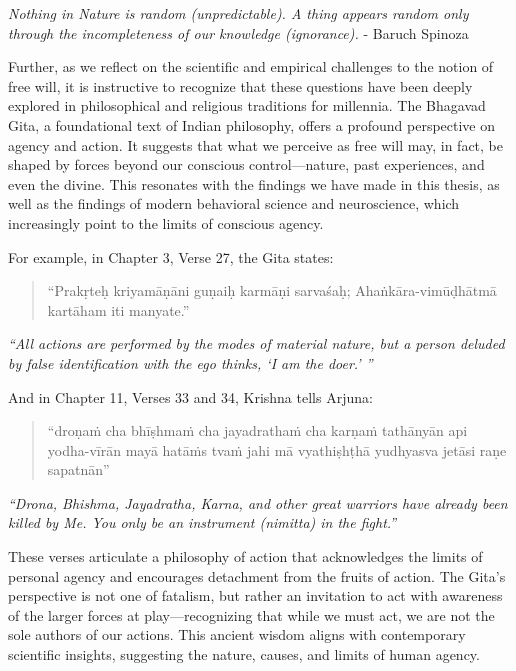 \textit{Nothing in Nature is random (unpredictable). A thing appears random only through the incompleteness of our knowledge (ignorance).} - Baruch Spinoza


Further, as we reflect on the scientific and empirical challenges to the notion of free will, it is instructive to recognize that these questions have been deeply explored in philosophical and religious traditions for millennia. The Bhagavad Gita, a foundational text of Indian philosophy, offers a profound perspective on agency and action. It suggests that what we perceive as free will may, in fact, be shaped by forces beyond our conscious control—nature, past experiences, and even the divine. This resonates with the findings we have made in this thesis, as well as the findings of modern behavioral science and neuroscience, which increasingly point to the limits of conscious agency.



For example, in Chapter 3, Verse 27, the Gita states:

\begin{quote}
    ``Prakṛteḥ kriyamāṇāni guṇaiḥ karmāṇi sarvaśaḥ;
    Ahaṅkāra-vimūḍhātmā kartāham iti manyate.''
\end{quote}

\textit{``All actions are performed by the modes of material nature, but a person deluded by false identification with the ego thinks, `I am the doer.' ''}

And in Chapter 11, Verses 33 and 34, Krishna tells Arjuna:

\begin{quote}
    ``droṇaṁ cha bhīṣhmaṁ cha jayadrathaṁ cha
    karṇaṁ tathānyān api yodha-vīrān 
    mayā hatāṁs tvaṁ jahi mā vyathiṣhṭhā
    yudhyasva jetāsi raṇe sapatnān''
\end{quote}

\textit{``Drona, Bhishma, Jayadratha, Karna, and other great warriors have already been killed by Me. You only be an instrument (nimitta) in the fight.''}

These verses articulate a philosophy of action that acknowledges the limits of personal agency and encourages detachment from the fruits of action. The Gita's perspective is not one of fatalism, but rather an invitation to act with awareness of the larger forces at play—recognizing that while we must act, we are not the sole authors of our actions. This ancient wisdom aligns with contemporary scientific insights, suggesting the nature, causes, and limits of human agency.
